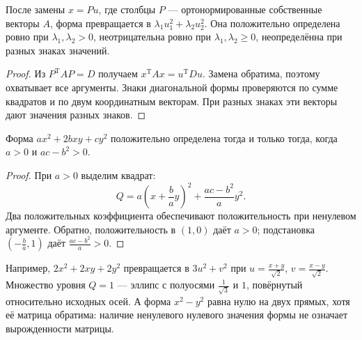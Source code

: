 \noindent\usebox{\CatFlowBox}\par\addvspace{5pt}
\begin{theorem}\label{thm:legacy-c27-5}
После замены \(x=Pu\), где столбцы \(P\) — ортонормированные собственные векторы \(A\), форма превращается в \(\lambda_1u_1^2+\lambda_2u_2^2\). Она положительно определена ровно при \(\lambda_1,\lambda_2>0\), неотрицательна ровно при \(\lambda_1,\lambda_2\ge0\), неопределённа при разных знаках значений.
\end{theorem}
\begin{proof}
Из \(P^{\mathrm T}AP=D\) получаем \(x^{\mathrm T}Ax=u^{\mathrm T}Du\). Замена обратима, поэтому охватывает все аргументы. Знаки диагональной формы проверяются по сумме квадратов и по двум координатным векторам. При разных знаках эти векторы дают значения разных знаков.
\end{proof}
\begin{theorem}\label{thm:legacy-c27-6}
Форма \(ax^2+2bxy+cy^2\) положительно определена тогда и только тогда, когда \(a>0\) и \(ac-b^2>0\).
\end{theorem}
\begin{proof}
При \(a>0\) выделим квадрат:
\[
Q=a\left(x+\frac ba y\right)^2+\frac{ac-b^2}{a}y^2.
\]
Два положительных коэффициента обеспечивают положительность при ненулевом аргументе. Обратно, положительность в \((1,0)\) даёт \(a>0\); подстановка \((-\frac ba,1)\) даёт \(\frac{ac-b^2}{a}>0\).
\end{proof}
Например, \(2x^2+2xy+2y^2\) превращается в \(3u^2+v^2\) при \(u=\frac{x+y}{\sqrt2}\), \(v=\frac{x-y}{\sqrt2}\). Множество уровня \(Q=1\) — эллипс с полуосями \(\frac1{\sqrt3}\) и \(1\), повёрнутый относительно исходных осей. А форма \(x^2-y^2\) равна нулю на двух прямых, хотя её матрица обратима: наличие ненулевого нулевого значения формы не означает вырожденности матрицы.

